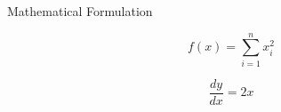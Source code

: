 
\begin{frame}{Mathematical Formulation}
	
	\[
	f(x)=\sum_{i=1}^{n}x_i^2
	\] 
	
	\[
	\frac{dy}{dx}=2x
	\]
	
\end{frame}